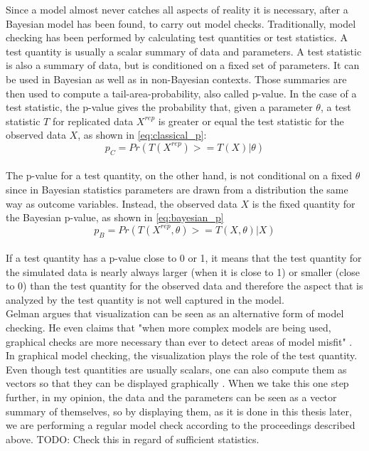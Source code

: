 \documentclass{article}
\begin{document}
Since a model almost never catches all aspects of reality it is necessary, after a Bayesian model has been found, to carry out model checks. Traditionally, model checking has been performed by calculating test quantities or test statistics. A test quantity is usually a scalar summary of data and parameters. A test statistic is also a summary of data, but is conditioned on a fixed set of parameters. It can be used in Bayesian as well as in non-Bayesian contexts. Those summaries are then used to compute a tail-area-probability, also called p-value. In the case of a test statistic, the p-value gives the probability that, given a parameter $\theta$, a test statistic $T$ for replicated data $X^{rep}$ is greater or equal the test statistic  for the observed data $X$, as shown in \autoref{eq:classical_p}:
\begin{equation}
p_C = Pr(T(X^{rep}) >= T(X) | \theta)
\label{eq:classical_p}
\end{equation}
\cite{1439840954}\\
The p-value for a test quantity, on the other hand, is not conditional on a fixed $\theta$ since in Bayesian statistics parameters are drawn from a distribution the same way as outcome variables. Instead, the observed data $X$ is the fixed quantity for the Bayesian p-value, as shown in \autoref{eq:bayesian_p}
\begin{equation}
p_B = Pr(T(X^{rep},\theta) >= T(X,\theta) | X)
\label{eq:bayesian_p}
\end{equation}
\cite{1439840954}\\
If a test quantity has a p-value close to 0 or 1, it means that the test quantity for the simulated data is nearly always larger (when it is close to 1) or smaller (close to 0) than the test quantity for the observed data and therefore the aspect that is analyzed by the test quantity is not well captured in the model.\\
Gelman \cite{gelman2004exploratory} argues that visualization can be seen as an alternative form of model checking. He even claims that "when more complex models are being used, graphical checks are more necessary than ever to detect areas of model misfit" \cite{gelman2004exploratory}. In graphical model checking, the visualization plays the role of the test quantity. Even though test quantities are usually scalars, one can also compute them as vectors so that they can be displayed graphically \cite{gelman2004exploratory}. When we take this one step further, in my opinion, the data and the parameters can be seen as a vector summary of themselves, so by displaying them, as it is done in this thesis later, we are performing a regular model check according to the proceedings described above. TODO: Check this in regard of sufficient statistics.
\end{document}
